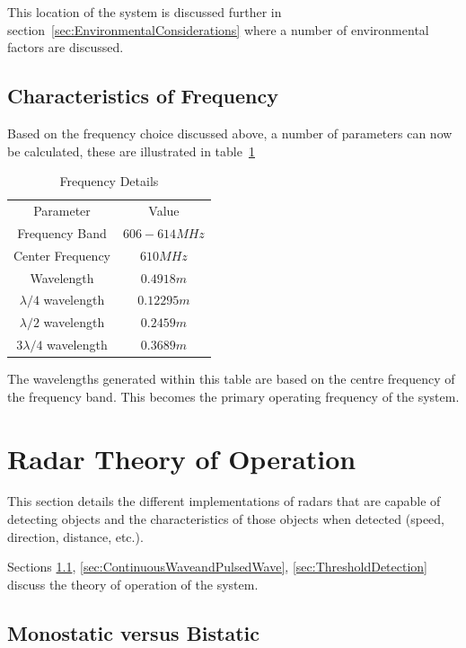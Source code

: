 \documentclass[11pt]{witseiepaper}
\begin{document}
This location of the system is discussed further in section~\ref{sec:EnvironmentalConsiderations} where a number of environmental factors are discussed.


\subsection{Characteristics of Frequency}
Based on the frequency choice discussed above, a number of parameters can now be calculated, these are illustrated in table~\ref{tab:FrequencyDetails}

\begin{table}
    \begin{center}
        \begin{tabular}{ c c }
            \hline 
            Parameter & Value \\
            Frequency Band & $606 - 614 MHz$ \\
            Center Frequency & $ 610 MHz$ \\
            Wavelength & $0.4918 m$ \\
            $\lambda /4$ wavelength & $0.12295 m$ \\
            $\lambda /2$ wavelength & $0.2459 m$ \\
            $3 \lambda /4$ wavelength & $0.3689 m$ \\                
        \end{tabular}
        \caption{Frequency Details}
        \label{tab:FrequencyDetails}
    \end{center}
\end{table}
The wavelengths generated within this table are based on the centre frequency of the frequency band. This becomes the primary operating frequency of the system.


\section{Radar Theory of Operation} \label{sec:ArrayStructure}
This section details the different implementations of radars that are capable of detecting objects and the characteristics of those objects when detected (speed, direction, distance, etc.).

Sections \ref{sec:MonostaticvsBistatic}, \ref{sec:ContinuousWaveandPulsedWave}, \ref{sec:ThresholdDetection} discuss the theory of operation of the system.

\subsection{Monostatic versus Bistatic} \label{sec:MonostaticvsBistatic}
\end{document}
